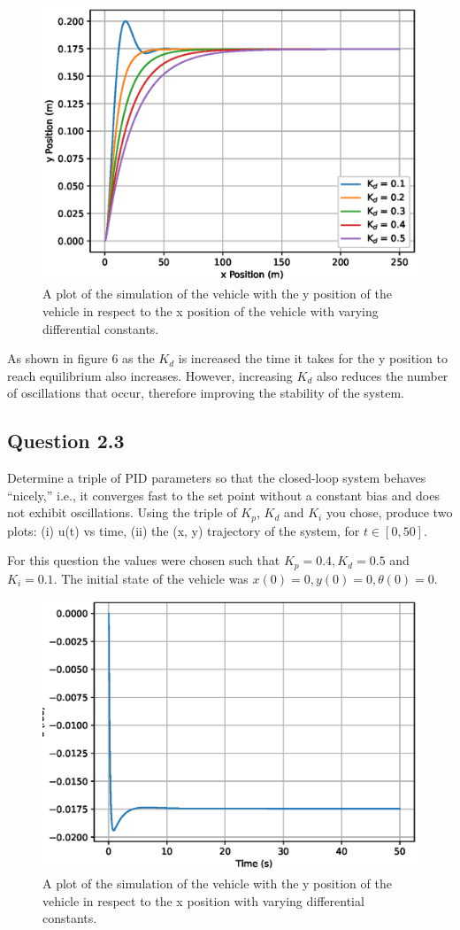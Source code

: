 \documentclass[a4paper,10pt,reqno]{amsart}
\numberwithin{equation}{section}
\begin{document}
         \begin{figure}[h]
            \centering
            \includegraphics[width=0.6\linewidth]{figures/question_2_2.eps}
            \caption{A plot of the simulation of the vehicle with the y position of the vehicle in respect to the x position of the vehicle with varying differential constants.}
        \end{figure}
        
        \medskip
        As shown in figure 6 as the \(K_d\) is increased the time it takes for the y position to reach equilibrium also increases. However, increasing \(K_d\) also reduces the number of oscillations that occur, therefore improving the stability of the system.
        
    \subsection{Question 2.3}
        Determine a triple of PID parameters so that the closed-loop system behaves “nicely,” i.e., it converges fast to the set point without a constant bias and does not exhibit oscillations. Using the triple of \(K_p\), \(K_d\) and \(K_i\) you chose, produce two plots: (i) u(t) vs time, (ii) the (x, y) trajectory of the system, for \(t \in [0, 50]\).
        
        \medskip
        For this question the values were chosen such that \(K_p = 0.4, K_d = 0.5\) and \(K_i = 0.1\). The initial state of the vehicle was \(x(0) = 0, y(0) = 0, \theta(0) = 0\).
        
        \begin{figure}[h]
            \centering
            \includegraphics[width=0.6\linewidth]{figures/question_2_3_a.eps}
            \caption{A plot of the simulation of the vehicle with the y position of the vehicle in respect to the x position with varying differential constants.}
        \end{figure}
        
\end{document}
